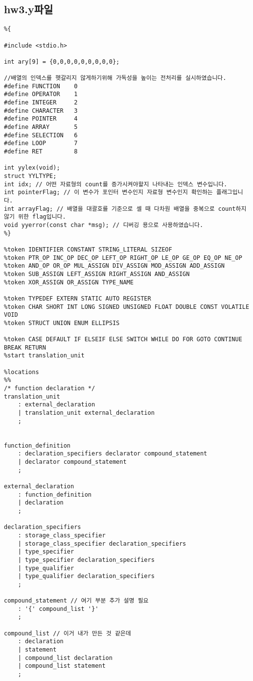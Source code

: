 \documentclass[11pt,oneside,a4paper]{article}
\begin{document}
\subsection{hw3.y파일}
\begin{verbatim} 
%{

#include <stdio.h>

int ary[9] = {0,0,0,0,0,0,0,0,0};

//배열의 인덱스를 헷갈리지 않게하기위해 가독성을 높이는 전처리를 실시하였습니다.
#define	FUNCTION	0
#define OPERATOR	1
#define INTEGER		2
#define CHARACTER	3
#define POINTER		4
#define ARRAY		5
#define SELECTION	6
#define LOOP		7
#define RET			8

int yylex(void);
struct YYLTYPE;
int idx; // 어떤 자료형의 count를 증가시켜야할지 나타내는 인덱스 변수입니다.
int pointerFlag; // 이 변수가 포인터 변수인지 자료형 변수인지 확인하는 플래그입니다.
int arrayFlag; // 배열을 대괄호를 기준으로 셀 때 다차원 배열을 중복으로 count하지 않기 위한 flag입니다.
void yyerror(const char *msg); // 디버깅 용으로 사용하였습니다.
%}

%token IDENTIFIER CONSTANT STRING_LITERAL SIZEOF
%token PTR_OP INC_OP DEC_OP LEFT_OP RIGHT_OP LE_OP GE_OP EQ_OP NE_OP
%token AND_OP OR_OP MUL_ASSIGN DIV_ASSIGN MOD_ASSIGN ADD_ASSIGN
%token SUB_ASSIGN LEFT_ASSIGN RIGHT_ASSIGN AND_ASSIGN
%token XOR_ASSIGN OR_ASSIGN TYPE_NAME

%token TYPEDEF EXTERN STATIC AUTO REGISTER
%token CHAR SHORT INT LONG SIGNED UNSIGNED FLOAT DOUBLE CONST VOLATILE VOID
%token STRUCT UNION ENUM ELLIPSIS

%token CASE DEFAULT IF ELSEIF ELSE SWITCH WHILE DO FOR GOTO CONTINUE BREAK RETURN
%start translation_unit

%locations
%%
/* function declaration */
translation_unit
	: external_declaration
	| translation_unit external_declaration
	;


function_definition
	: declaration_specifiers declarator compound_statement
	| declarator compound_statement
	;

external_declaration
	: function_definition
	| declaration
	;

declaration_specifiers
	: storage_class_specifier
	| storage_class_specifier declaration_specifiers 
	| type_specifier
	| type_specifier declaration_specifiers
	| type_qualifier 
	| type_qualifier declaration_specifiers
	;

compound_statement // 여기 부분 추가 설명 필요
	: '{' compound_list '}'
	;

compound_list // 이거 내가 만든 것 같은데
	: declaration
	| statement
	| compound_list declaration
	| compound_list statement
	;


\end{verbatim}
\end{document}
